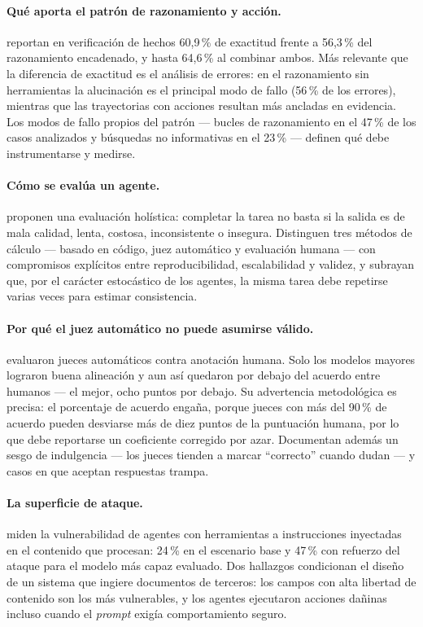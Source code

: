 \paragraph{Qué aporta el patrón de razonamiento y acción.}
\textcite{yao2023react} reportan en verificación de hechos 60,9\,\% de exactitud
frente a 56,3\,\% del razonamiento encadenado, y hasta 64,6\,\% al combinar ambos. Más
relevante que la diferencia de exactitud es el análisis de errores: en el razonamiento
sin herramientas la alucinación es el principal modo de fallo (56\,\% de los errores),
mientras que las trayectorias con acciones resultan más ancladas en evidencia. Los
modos de fallo propios del patrón --- bucles de razonamiento en el 47\,\% de los casos
analizados y búsquedas no informativas en el 23\,\% --- definen qué debe instrumentarse
y medirse.

\paragraph{Cómo se evalúa un agente.}
\textcite{mohammadi2025evaluation} proponen una evaluación holística: completar la
tarea no basta si la salida es de mala calidad, lenta, costosa, inconsistente o
insegura. Distinguen tres métodos de cálculo --- basado en código, juez automático y
evaluación humana --- con compromisos explícitos entre reproducibilidad, escalabilidad
y validez, y subrayan que, por el carácter estocástico de los agentes, la misma tarea
debe repetirse varias veces para estimar consistencia.

\paragraph{Por qué el juez automático no puede asumirse válido.}
\textcite{thakur2025judging} evaluaron jueces automáticos contra anotación humana. Solo
los modelos mayores lograron buena alineación y aun así quedaron por debajo del acuerdo
entre humanos --- el mejor, ocho puntos por debajo. Su advertencia metodológica es
precisa: el porcentaje de acuerdo engaña, porque jueces con más del 90\,\% de acuerdo
pueden desviarse más de diez puntos de la puntuación humana, por lo que debe
reportarse un coeficiente corregido por azar. Documentan además un sesgo de indulgencia
--- los jueces tienden a marcar \enquote{correcto} cuando dudan --- y casos en que
aceptan respuestas trampa.

\paragraph{La superficie de ataque.}
\textcite{zhan2024injecagent} miden la vulnerabilidad de agentes con herramientas a
instrucciones inyectadas en el contenido que procesan: 24\,\% en el escenario base y
47\,\% con refuerzo del ataque para el modelo más capaz evaluado. Dos hallazgos
condicionan el diseño de un sistema que ingiere documentos de terceros: los campos con
alta libertad de contenido son los más vulnerables, y los agentes ejecutaron acciones
dañinas incluso cuando el \emph{prompt} exigía comportamiento seguro.

